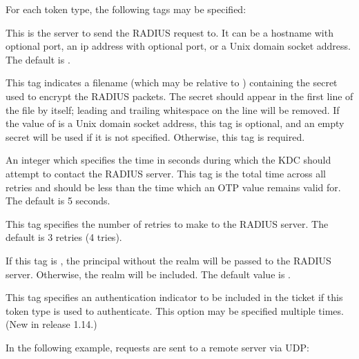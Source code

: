 \documentclass[letterpaper,10pt,english]{sphinxmanual}
\begin{document}
\sphinxAtStartPar
For each token type, the following tags may be specified:
\begin{description}
\sphinxAtStartPar
This is the server to send the RADIUS request to.  It can be a
hostname with optional port, an ip address with optional port, or
a Unix domain socket address.  The default is
{\hyperref[\detokenize{mitK5defaults:paths}]{}}.

\sphinxAtStartPar
This tag indicates a filename (which may be relative to {\hyperref[\detokenize{mitK5defaults:paths}]{}})
containing the secret used to encrypt the RADIUS packets.  The
secret should appear in the first line of the file by itself;
leading and trailing whitespace on the line will be removed.  If
the value of  is a Unix domain socket address, this tag
is optional, and an empty secret will be used if it is not
specified.  Otherwise, this tag is required.

\sphinxAtStartPar
An integer which specifies the time in seconds during which the
KDC should attempt to contact the RADIUS server.  This tag is the
total time across all retries and should be less than the time
which an OTP value remains valid for.  The default is 5 seconds.

\sphinxAtStartPar
This tag specifies the number of retries to make to the RADIUS
server.  The default is 3 retries (4 tries).

\sphinxAtStartPar
If this tag is , the principal without the realm will be
passed to the RADIUS server.  Otherwise, the realm will be
included.  The default value is .

\sphinxAtStartPar
This tag specifies an authentication indicator to be included in
the ticket if this token type is used to authenticate.  This
option may be specified multiple times.  (New in release 1.14.)

\end{description}

\sphinxAtStartPar
In the following example, requests are sent to a remote server via UDP:
\end{document}

